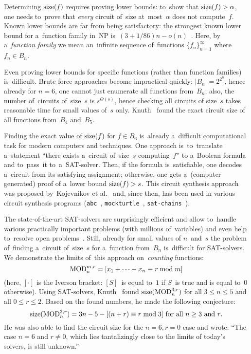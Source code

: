 Determining $\operatorname{size}(f)$ requires
proving lower bounds:
to~show that $\operatorname{size}(f)> \alpha$,
one needs to~prove that \emph{every} circuit
of~size at~most~$\alpha$ does not compute~$f$.
Known lower bounds are far from being satisfactory:
the strongest known lower bound for a~function family
in~NP is~$(3+1/86)n-o(n)$~\cite{DBLP:conf/focs/FindGHK16}.
Here, by a~\emph{function family} we mean an~infinite sequence of~functions $\{f_n\}_{n=1}^{\infty}$ where $f_n \in B_n$.

Even proving lower bounds for specific functions (rather than function families) is~difficult. Brute force approaches become impractical quickly: $|B_n|=2^{2^n}$, hence already for $n=6$, one cannot just enumerate all
functions from~$B_n$; also, the number of~circuits
of~size~$s$ is $s^{\Theta(s)}$, hence checking all circuits of size~$s$ takes reasonable time for small values of~$s$ only.
Knuth~\cite{Knuth:2008:ACP:1377542} found the exact circuit size of all functions from~$B_4$ and~$B_5$.

Finding the exact value of $\operatorname{size}(f)$ for $f \in B_6$
is~already a~difficult computational task for modern
computers and techniques. One approach
is~to~translate a~statement ``there exists a~circuit
of~size~$s$ computing~$f$'' to a~Boolean formula and
to~pass~it to~a~SAT-solver. Then, if the formula
is~satisfiable, one decodes a~circuit from its satisfying
assignment; otherwise, one gets a~(computer generated) proof of a~lower bound $\operatorname{size}(f) > s$. This circuit synthesis approach was proposed
by~Kojevnikov et al.~\cite{DBLP:conf/sat/KojevnikovKY09}
and, since then, has been used in various circuit synthesis programs (\texttt{abc}~\cite{abc}, \texttt{mockturtle}~\cite{EPFLLibraries}, \texttt{sat-chains}~\cite{knuthreduction}).

The state-of-the-art SAT-solvers are surprisingly efficient and allow to~handle
various practically important problems (with millions
of~variables) and even help to~resolve open
problems~\cite{DBLP:conf/cade/BrakensiekHMN20}.
Still, already for small values of $n$~and~$s$ the problem
of~finding a~circuit of~size~$s$ for a~function from~$B_n$
is~difficult for SAT-solvers.
We demonstrate the limits
of~this approach on~\emph{counting} functions:
\[\operatorname{MOD}_n^{m,r}=[x_1+\dotsb+x_n \equiv r \bmod m]\]
(here, $[\cdot]$ is the Iverson bracket: $[S]$~is equal to~$1$ if $S$~is true and is equal to~$0$ otherwise).
Using SAT-solvers, Knuth~\cite[solution to exercise~$480$]{Knuth:2015:ACP:2898950}
found $\operatorname{size}(\operatorname{MOD}_n^{3,r})$ for all $3 \le n \le 5$ and all $0 \le r \le 2$. Based on the found numbers, he made the following conjecture:
\begin{equation}\label{conjecture}
\operatorname{size}(\operatorname{MOD}_n^{3,r})=3n-5-[(n+r) \equiv r\bmod 3] \text{ for all $n \ge 3$ and $r$.}
\end{equation}
He was also able to find the circuit size
for the $n=6,r=0$ case and wrote: ``The case $n=6$ and $r \neq 0$, which lies tantalizingly close to the limits of
today's solvers, is still unknown.''

